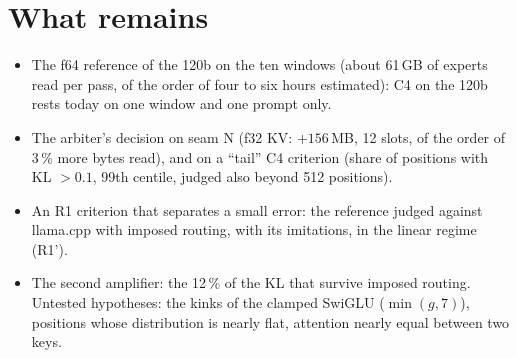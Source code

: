 \section{What remains}\label{sec:t2r-reste}

\begin{itemize}
\item The f64 reference of the 120b on the ten windows (about 61\,GB of experts read per pass, of the order of four to six hours estimated): C4 on the 120b rests today on one window and one prompt only.
\item The arbiter's decision on seam N (f32 KV: $+156$\,MB, 12 slots, of the order of 3\,\% more bytes read), and on a \enquote{tail} C4 criterion (share of positions with KL $> 0.1$, 99th centile, judged also beyond 512 positions).
\item An R1 criterion that separates a small error: the reference judged against llama.cpp with imposed routing, with its imitations, in the linear regime (R1').
\item The second amplifier: the 12\,\% of the KL that survive imposed routing. Untested hypotheses: the kinks of the clamped SwiGLU ($\min(g, 7)$), positions whose distribution is nearly flat, attention nearly equal between two keys.
\end{itemize}

